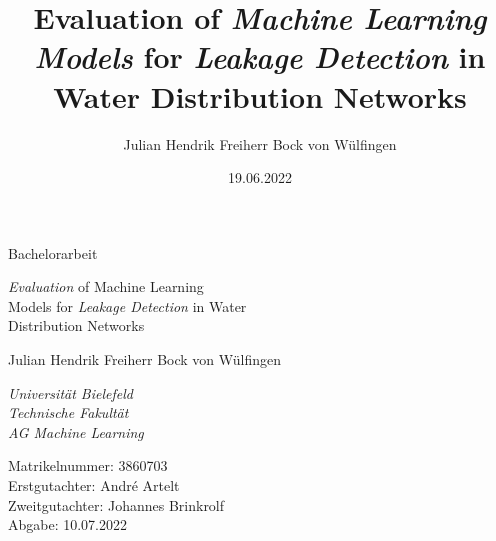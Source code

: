 \documentclass[twoside]{report}
\title{
    Evaluation of {\em Machine Learning Models} for {\em Leakage Detection} in Water Distribution Networks
}
\author{Julian Hendrik Freiherr Bock von Wülfingen}
\date{19.06.2022}
\begin{document}
\begin{titlepage} %

	\begin{center}

        \vspace*{\baselineskip}

        {\Large Bachelorarbeit}
        
        \vspace{1.75\baselineskip}
        
        {\LARGE {\em Evaluation} of Machine Learning \\ Models for {\em Leakage Detection} in Water \\ Distribution Networks\par} %
    
        \vspace{5\baselineskip}
        
        {\Large Julian Hendrik Freiherr Bock von Wülfingen}
        
        \vspace{2\baselineskip}
        
        \textit{Universität Bielefeld \\ Technische Fakultät \\ AG Machine Learning}

    \end{center}
	
	\vfill %

	\vspace{0.3\baselineskip} %
	
	Matrikelnummer:	  3860703\\
    Erstgutachter:	  André Artelt\\
    Zweitgutachter:	  Johannes Brinkrolf\\
    Abgabe:		    10.07.2022

\end{titlepage}

\tableofcontents




\end{document}
